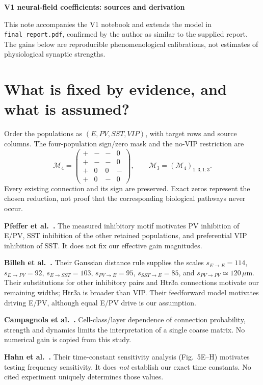 \documentclass[11pt]{article}
\begin{document}
\begin{center}\large\bfseries V1 neural-field coefficients: sources and derivation\end{center}
This note accompanies the V1 notebook and extends the model in \texttt{final\_report.pdf}, confirmed by the author as similar to the supplied
report. The gains below are reproducible phenomenological calibrations, not
estimates of physiological synaptic strengths.

\section{What is fixed by evidence, and what is assumed?}
Order the populations as $(E,PV,SST,VIP)$, with target rows and source columns.
The four-population sign/zero mask and the no-VIP restriction are
\begin{equation}
 \mathcal M_4=\begin{pmatrix}+&-&-&0\\+&-&-&0\\+&0&0&-\\+&0&-&0\end{pmatrix},
 \qquad \mathcal M_3=(\mathcal M_4)_{1:3,1:3}.
 \label{eq:mask}
\end{equation}
Every existing connection and its sign are preserved. Exact zeros represent
the chosen reduction, not proof that the corresponding biological pathways
never occur.

\textbf{Pfeffer et al.\ \cite{pfeffer}.} The measured inhibitory motif motivates
PV inhibition of E/PV, SST inhibition of the other retained populations, and
preferential VIP inhibition of SST. It does not fix our effective gain magnitudes.

\textbf{Billeh et al.\ \cite{billeh}.} Their Gaussian distance rule supplies the
scales $s_{E\to E}=114$, $s_{E\to PV}=92$, $s_{E\to SST}=103$,
$s_{PV\to E}=95$, $s_{SST\to E}=85$, and $s_{PV\to PV}\simeq120\,\mu$m.
Their substitutions for other inhibitory pairs and Htr3a connections motivate
our remaining widths; Htr3a is broader than VIP. Their feedforward model motivates
driving E/PV, although equal E/PV drive is our assumption.

\textbf{Campagnola et al.\ \cite{campagnola}.} Cell-class/layer dependence of
connection probability, strength and dynamics limits the interpretation of a
single coarse matrix. No numerical gain is copied from this study.

\textbf{Hahn et al.\ \cite{hahn}.} Their time-constant sensitivity analysis
(Fig.~5E--H) motivates testing frequency sensitivity. It does \emph{not} establish
our exact time constants. No cited experiment uniquely determines those values.
\end{document}
